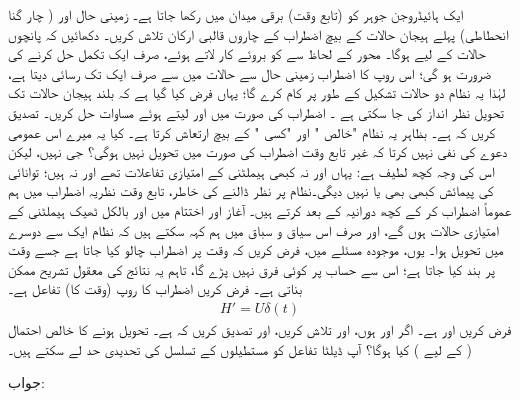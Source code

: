 ایک ہائیڈروجن جوہر کو   (تابع وقت) برقی میدان  میں رکھا جاتا ہے۔ زمینی حال  اور ( چار گنا انحطاطی) پہلے  ہیجان حالات  کے بیچ اضطراب  کے چاروں قالبی ارکان  تلاش کریں۔ دکھائیں کہ پانچوں حالات کے لیے  ہوگا۔   محور  کے لحاظ سے    کو بروئے کار لاتے ہوئے،   صرف ایک تکمل حل کرنے کی ضرورت ہو گی؛  اس روپ کا اضطراب   زمینی حال سے  حالات میں سے صرف ایک تک رسائی دیتا ہے،  لہٰذا  یہ نظام دو حالات تشکیل  کے طور پر کام کرے گا؛ یہاں فرض کیا گیا ہے کہ  بلند ہیجان حالات  تک تحویل  نظر انداز کی  جا سکتی ہے ۔
 اضطراب کی صورت میں  اور  لیتے ہوئے مساوات  حل کریں۔ تصدیق کریں  کہ  ہے۔   بظاہر   یہ نظام  "خالص "  اور "کسی "  کے بیچ ارتعاش کرتا ہے۔ کیا یہ میرے اس عمومی دعوے کی نفی نہیں کرتا کہ غیر تابع وقت اضطراب کی صورت میں  تحویل  نہیں ہوگی؟ جی نہیں،  لیکن اس کی وجہ    کچھ لطیف ہے: یہاں  اور  نہ کبھی ہیملٹنی کے امتیازی تفاعلات تھے اور نہ ہیں؛  توانائی کی پیمائش کبھی بھی  یا  نہیں دیگی۔نظام پر نظر ڈالنے کی خاطر،   تابع وقت نظریہ اضطراب میں ہم  عموماً    اضطراب   کر کے کچھ  دورانیہ کے  بعد           کرتے ہیں۔ آغاز اور اختتام میں  اور  بالکل ٹھیک ہیملٹنی کے امتیازی حالات ہوں گے،  اور صرف اس  سیاق و سباق میں ہم کہہ سکتے ہیں کہ  نظام ایک سے دوسرے میں  تحویل  ہوا۔ یوں، موجودہ مسئلے میں، فرض کریں  کہ وقت  پر اضطراب چالو کیا جاتا ہے جسے وقت  پر بند  کیا جاتا ہے؛ اس سے حساب پر کوئی فرق نہیں پڑے گا،  تاہم یہ  نتائج کی معقول تشریح ممکن بناتی ہے۔
فرض کریں اضطراب کا روپ  (وقت کا)   تفاعل ہے۔
\begin{align*}
	H'=U\delta(t) 
\end{align*}
فرض کریں    اور  ہے۔ اگر  اور  ہوں،    اور  تلاش کریں،  اور  تصدیق کریں کہ   ہے۔ تحویل ہونے   کا خالص  احتمال (  کے لیے )  کیا ہوگا؟   آپ ڈیلٹا تفاعل کو مستطیلوں کے تسلسل کی تحدیدی حد لے سکتے ہیں۔

جواب:  


